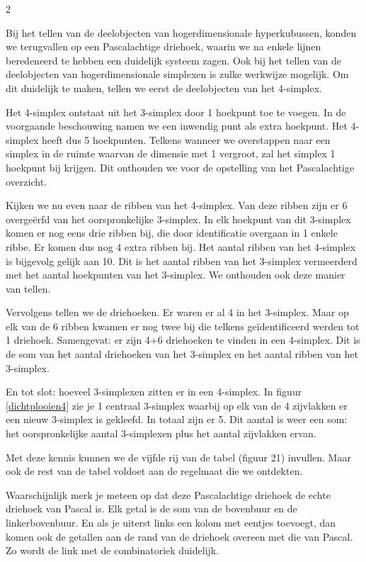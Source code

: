 \begin{multicols}{2}

\setlength{\parskip}{1em}

Bij het tellen van de deelobjecten van hogerdimensionale hyperkubussen, konden we terugvallen op een Pascalachtige driehoek, waarin we na enkele lijnen beredeneerd te hebben een duidelijk systeem zagen. Ook bij het tellen van de deelobjecten van hogerdimensionale simplexen is zulke werkwijze mogelijk. Om dit duidelijk te maken, tellen we eerst de deelobjecten van het 4-simplex.

Het 4-simplex ontstaat uit het 3-simplex door 1 hoekpunt toe te voegen. In de voorgaande beschouwing namen we een inwendig punt als extra hoekpunt. Het 4-simplex heeft dus 5 hoekpunten. Telkens wanneer we overstappen naar een simplex in de ruimte waarvan de dimensie met 1 vergroot, zal het simplex 1 hoekpunt bij krijgen. Dit onthouden we voor de opstelling van het Pascalachtige overzicht.

Kijken we nu even naar de ribben van het 4-simplex. Van deze ribben zijn er 6 overgeërfd van het oorspronkelijke 3-simplex. In elk hoekpunt van dit 3-simplex komen er nog eens drie ribben bij, die door identificatie overgaan in 1 enkele ribbe. Er komen dus nog 4 extra ribben bij. Het aantal ribben van het 4-simplex is bijgevolg gelijk aan 10. Dit is het aantal ribben van het 3-simplex vermeerderd met het aantal hoekpunten van het 3-simplex. We onthouden ook deze manier van tellen.

Vervolgens tellen we de driehoeken. Er waren er al 4 in het 3-simplex. Maar op elk van de 6 ribben kwamen er nog twee bij die telkens geïdentificeerd werden tot 1 driehoek. Samengevat: er zijn 4+6 driehoeken te vinden in een 4-simplex. Dit is de som van het aantal driehoeken van het 3-simplex en het aantal ribben van het 3-simplex.

En tot slot: hoeveel 3-simplexen zitten er in een 4-simplex. In figuur \ref{dichtplooien4} zie je 1 centraal 3-simplex waarbij op elk van de 4 zijvlakken er een nieuw 3-simplex is gekleefd. In totaal zijn er 5. Dit aantal is weer een som: het oorspronkelijke aantal 3-simplexen plus het aantal zijvlakken ervan.

Met deze kennis kunnen we de vijfde rij van de  tabel (figuur 21) invullen. Maar ook de rest van de tabel voldoet aan de regelmaat die we ontdekten.

Waarschijnlijk merk je meteen op dat deze Pascalachtige driehoek de echte driehoek van Pascal is. Elk getal is de som van de bovenbuur en de linkerbovenbuur. En als je uiterst links een kolom met eentjes toevoegt, dan komen ook de getallen aan de rand van de driehoek overeen met die van Pascal. Zo wordt de link met de combinatoriek duidelijk.



\end{multicols}
